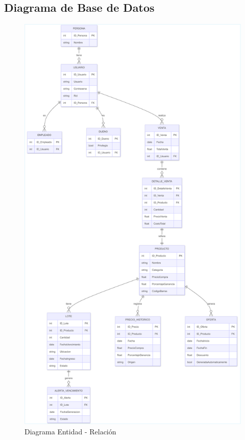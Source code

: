 \documentclass[twoside]{article}
\begin{document}
\newpage
\subsection{Diagrama de Base de Datos}

\begin{figure}[!h]
        \centering
        \includegraphics[width=0.73\linewidth]{diagramaBD.pdf}
        \caption{Diagrama Entidad - Relación}
        \label{fig:enter-label}
\end{figure}


\newpage






\newpage


\end{document}
